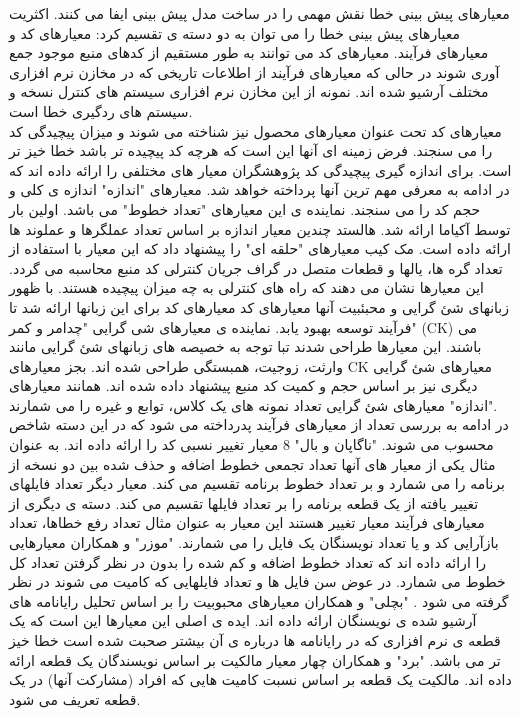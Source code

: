 معیارهای پیش بینی خطا نقش مهمی را در ساخت مدل پیش بینی ایفا می کنند. اکثریت معیارهای پیش بینی خطا را می توان به دو دسته ی تقسیم کرد: معیارهای کد و معیارهای فرآیند. معیارهای کد می توانند به طور مستقیم از کدهای منبع موجود جمع آوری شوند در حالی که معیارهای فرآیند  از اطلاعات تاریخی که در مخازن نرم افزاری مختلف آرشیو شده اند. نمونه از این مخازن نرم افزاری سیستم های کنترل نسخه و سیستم های ردگیری خطا است. \\
معیارهای کد تحت عنوان معیارهای محصول 
نیز شناخته می شوند و میزان پیچیدگی کد را می سنجند. فرض زمینه ای آنها این است که هرچه کد پیچیده تر باشد خطا خیز تر است. برای اندازه گیری پیچیدگی کد پژوهشگران معیار های مختلفی را ارائه داده اند که در ادامه به معرفی مهم ترین آنها پرداخته خواهد شد. معیارهای "اندازه" اندازه ی کلی و حجم کد را می سنجند. نماینده ی این معیارهای "تعداد خطوط" می باشد. اولین بار توسط آکیاما  \cite{akiyama1971example}  ارائه شد. هالستد  \cite{halstead1977elements} چندین معیار اندازه بر اساس  تعداد عملگرها و عملوند ها ارائه داده است. مک کیب معیارهای "حلقه ای" 
را پیشنهاد داد که این معیار با استفاده از تعداد گره ها، یالها و قطعات متصل در گراف جریان کنترلی کد منبع محاسبه می گردد\cite{mccabe1976complexity}. این معیارها نشان می دهند که راه های کنترلی به چه میزان پیچیده هستند. با ظهور زبانهای شئ گرایی و محبئبیت آنها معیارهای کد معیارهای کد برای این زبانها ارائه شد تا فرآیند توسعه بهبود یابد. نماینده ی معیارهای شی گرایی "چدامر و کمر" (CK) می باشند\cite{chidamber1994metrics}. این معیارها طراحی شدند تبا توجه به خصیصه های زبانهای شئ گرایی مانند وارثت، زوجیت، همبستگی طراحی شده اند. بجز معیارهای CK معیارهای شئ گرایی دیگری نیز بر اساس حجم و کمیت کد منبع پیشنهاد داده شده اند. همانند معیارهای "اندازه" معیارهای شئ گرایی تعداد نمونه های یک کلاس، توابع و غیره را می شمارند. \\
در ادامه به بررسی تعداد از معیارهای فرآیند پدرداخته می شود که در این دسته شاخص محسوب می شوند. "ناگاپان و بال" 8 معیار تغییر نسبی کد را ارائه داده اند\cite{nagappan2005use}. به عنوان مثال یکی از معیار های آنها تعداد تجمعی خطوط اضافه و حذف شده بین دو نسخه از برنامه را می شمارد و بر تعداد خطوط برنامه تقسیم می کند. معیار دیگر تعداد فایلهای تغییر یافته از یک قطعه برنامه را بر تعداد فایلها تقسیم می کند. دسته ی دیگری از معیارهای فرآیند معیار تغییر هستند این معیار به عنوان مثال تعداد رفع خطاها، تعداد بازآرایی کد  و یا تعداد نویسنگان یک فایل را می شمارند. "موزر" و همکاران معیارهایی را ارائه داده اند که تعداد خطوط اضافه و کم شده را بدون در نظر گرفتن تعداد کل خطوط می شمارد. در عوض سن فایل ها و تعداد فایلهایی که کامیت می شوند در نظر گرفته می شود \cite{moser2008comparative}.  "بچلی" و همکاران معیارهای محبوبیت را بر اساس تحلیل رایانامه های آرشیو شده ی نویسنگان ارائه داده اند. ایده ی اصلی این معیارها این است که یک قطعه ی  نرم افزاری که در رایانامه ها درباره ی آن بیشتر صحبت شده است خطا خیز تر می باشد\cite{bacchelli2010popular}. "برد" و همکاران چهار معیار مالکیت بر اساس نویسندگان یک قطعه ارائه داده اند. مالکیت یک قطعه بر اساس نسبت کامیت هایی که افراد (مشارکت آنها) در یک قطعه  تعریف می شود. 


